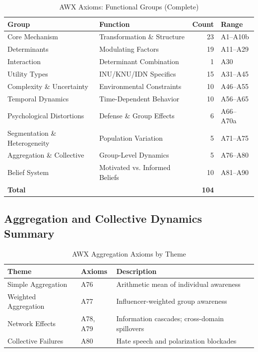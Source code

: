 \begin{table}[htbp]
\centering
\caption{AWX Axioms: Functional Groups (Complete)}
\label{tab:awx-groups}
\begin{tabular}{llrl}
\toprule
\textbf{Group} & \textbf{Function} & \textbf{Count} & \textbf{Range} \\
\midrule
Core Mechanism & Transformation \& Structure & 23 & A1--A10b \\
Determinants & Modulating Factors & 19 & A11--A29 \\
Interaction & Determinant Combination & 1 & A30 \\
Utility Types & INU/KNU/IDN Specifics & 15 & A31--A45 \\
Complexity \& Uncertainty & Environmental Constraints & 10 & A46--A55 \\
Temporal Dynamics & Time-Dependent Behavior & 10 & A56--A65 \\
Psychological Distortions & Defense \& Group Effects & 6 & A66--A70a \\
Segmentation \& Heterogeneity & Population Variation & 5 & A71--A75 \\
Aggregation \& Collective & Group-Level Dynamics & 5 & A76--A80 \\
Belief System & Motivated vs. Informed Beliefs & 10 & A81--A90 \\
\midrule
\textbf{Total} & & \textbf{104} & \\
\bottomrule
\end{tabular}
\end{table}

\subsection{Aggregation and Collective Dynamics Summary}

\begin{table}[htbp]
\centering
\caption{AWX Aggregation Axioms by Theme}
\label{tab:awx-aggregation-themes}
\begin{tabular}{llp{6cm}}
\toprule
\textbf{Theme} & \textbf{Axioms} & \textbf{Description} \\
\midrule
Simple Aggregation & A76 & Arithmetic mean of individual awareness \\
Weighted Aggregation & A77 & Influencer-weighted group awareness \\
Network Effects & A78, A79 & Information cascades; cross-domain spillovers \\
Collective Failures & A80 & Hate speech and polarization blockades \\
\bottomrule
\end{tabular}
\end{table}


